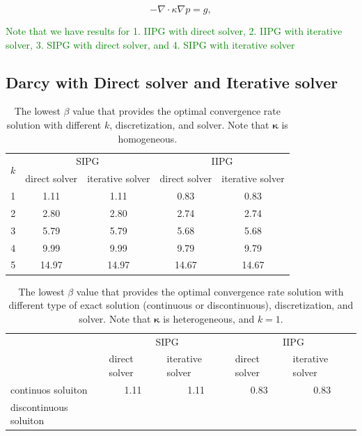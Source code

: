 \documentclass{article}
\newcommand{\meen}[1]{{\textcolor{green}{#1}}}
\begin{document}
\begin{equation} \label{eq:poisson}
-\nabla \cdot \kappa \nabla  p=g,
\end{equation}

\meen{Note that we have results for 1. IIPG with direct solver, 2. IIPG with iterative solver, 3. SIPG with direct solver, and 4. SIPG with iterative solver}

\subsection{Darcy with Direct solver and Iterative solver}

\begin{table}[!htbp]
  \centering
  \caption{The lowest $\beta$ value that provides the optimal convergence rate solution with different $k$, discretization, and solver. Note that $\bm{\kappa}$ is homogeneous.}
    \begin{tabular}{|c|c|c|c|c|}
    \hline
    \multirow{2}[4]{*}{$k$} & \multicolumn{2}{c|}{SIPG} & \multicolumn{2}{c|}{IIPG} \\
\cline{2-5}          & \multicolumn{1}{l|}{direct solver} & \multicolumn{1}{l|}{iterative solver} & \multicolumn{1}{l|}{direct solver} & \multicolumn{1}{l|}{iterative solver} \\
    \hline
    1     & 1.11  & 1.11  & 0.83  & 0.83 \\
    \hline
    2     & 2.80  & 2.80  & 2.74  & 2.74 \\
    \hline
    3     & 5.79  & 5.79  & 5.68  & 5.68 \\
    \hline
    4     & 9.99  & 9.99  & 9.79  & 9.79 \\
    \hline
    5     & 14.97 & 14.97 & 14.67 & 14.67 \\
    \hline
    \end{tabular}%
  \label{tab:ell_homo_beta_unstable}%
\end{table}%

\begin{table}[htbp]
  \centering
  \caption{The lowest $\beta$ value that provides the optimal convergence rate solution with different type of exact solution (continuous or discontinuous), discretization, and solver. Note that $\bm{\kappa}$ is heterogeneous, and $k=1$.}
    \begin{tabular}{|l|r|r|r|r|}
    \hline
    \multirow{2}[4]{*}{} & \multicolumn{2}{c|}{SIPG} & \multicolumn{2}{c|}{IIPG} \\
\cline{2-5}          & \multicolumn{1}{l|}{direct solver} & \multicolumn{1}{l|}{iterative solver} & \multicolumn{1}{l|}{direct solver} & \multicolumn{1}{l|}{iterative solver} \\
    \hline
    continuos soluiton & \multicolumn{1}{c|}{1.11} & \multicolumn{1}{c|}{1.11} & \multicolumn{1}{c|}{0.83} & \multicolumn{1}{c|}{0.83} \\
    \hline
    discontinuous soluiton &       &       &       &  \\
    \hline
    \end{tabular}%
  \label{tab:addlabel}%
\end{table}%
\end{document}
